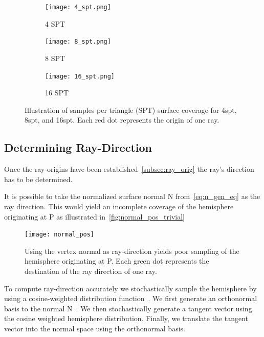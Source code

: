 \begin{figure}[htb]
  \begin{subfigure}{0.32\textwidth}
  \texttt{[image: 4\_spt.png]}
  \caption{4 SPT}
  \end{subfigure}
  \hspace*{\fill} %
  \begin{subfigure}{0.32\textwidth}
  \texttt{[image: 8\_spt.png]}
  \caption{8 SPT}
  \end{subfigure}
  \hspace*{\fill} %
  \begin{subfigure}{0.32\textwidth}
  \texttt{[image: 16\_spt.png]}
  \caption{16 SPT}
  \end{subfigure}
  \caption{\label{fig:spt_tradeoff}
           Illustration of samples per triangle (SPT) surface coverage for 4spt, 8spt, and 16spt. Each red dot represents the origin of one ray.
           }
\end{figure}

\subsection{Determining Ray-Direction}
Once the ray-origins have been established~\autoref{subsec:ray_orig} the ray's direction has to be determined.

It is possible to take the normalized surface normal N from~\autoref{eq:n_gen_eq} as the ray direction. This would yield an incomplete coverage of the hemisphere originating at P as illustrated in~\autoref{fig:normal_pos_trivial}

\begin{figure}[htb]
  \centering
  \texttt{[image: normal\_pos]}
 
  \caption{\label{fig:normal_pos_trivial}Using the vertex normal as ray-direction yields poor sampling of the hemisphere originating at P. Each green dot represents the destination of the ray direction of one ray.}
\end{figure}

To compute ray-direction accurately we stochastically sample the hemisphere by using a cosine-weighted distribution function~\cite{10.5555/1196364}.
We first generate an orthonormal basis to the normal N~\cite{Duff2017BuildingAO}. We then stochastically generate a tangent vector using the cosine weighted hemisphere distribution. Finally, we translate the tangent vector into the normal space using the orthonormal basis. 

